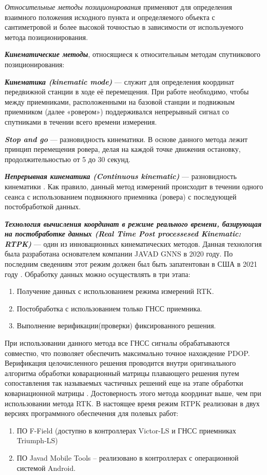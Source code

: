 \textit{Относительные методы позиционирования} применяют для определения взаимного положения исходного пункта и определяемого объекта с сантиметровой и более высокой точностью в зависимости от используемого метода позиционирования.

\textbf{\textit{Кинематические методы}}, относящиеся к относительным методам спутникового позиционирования:

\textbf{\textit{Кинематика (kinematic mode)}} --- служит для определения координат передвижной станции в ходе её перемещения. При работе необходимо, чтобы между приемниками, расположенными на базовой станции и подвижным приемником (далее «ровером») поддерживался непрерывный сигнал со спутниками в течении всего времени измерения.

\textbf{\textit{Stop and go}} --- разновидность кинематики. В основе данного метода лежит принцип перемещения ровера, делая на каждой точке движения остановку, продолжительностью от 5 до 30 секунд.

\textbf{\textit{Непрерывная кинематика (Continuous kinematic)}} --- разновидность кинематики \cite{src02}. Как правило, данный метод измерений происходит в течении одного сеанса с использованием подвижного приемника (ровера) с последующей постобработкой данных.

\textbf{\textit{Технология вычисления координат в режиме реального времени, базирующая на постобработке данных (Real Time Post processesed Kinematic: RTPK)}} --- один из инновационных кинематических методов. Данная технология была разработана основателем компании JAVAD GNNS в 2020 году. По последним сведениям этот режим должен был быть запатентован в США в 2021 году \cite{src73}. Обработку данных можно осуществлять в три этапа: 
\begin{enumerate}
	\item Получение данных с использованием режима измерений RTK.
	\item Постобработка с использованием только ГНСС приемника.
	\item Выполнение верификации(проверки) фиксированного решения.
\end{enumerate}


При использовании данного метода все ГНСС сигналы обрабатываются совместно, что позволяет обеспечить максимально точное нахождение PDOP. Верификация целочисленного решения проводится внутри оригинального алгоритма обработки коварационный матрицы плавающего решения путем сопоставления так называемых частичных решений еще на этапе обработки ковариационной матрицы \cite{src40,src49}. Достоверность этого метода координат выше, чем при использовании метода RTK. В настоящее время режим RTPK реализован в двух версиях программного обеспечения для полевых работ:
\begin{enumerate}
	\item ПО F-Field (доступно в контроллерах Victor-LS и ГНСС приемниках Triumph-LS) 
	\item ПО Javad Mobile Tools – реализовано в контроллерах с операционной системой Android. 
\end{enumerate}

